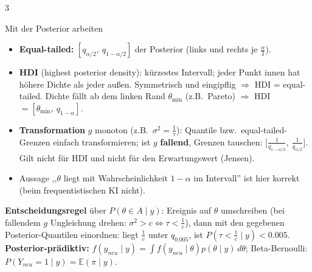 \documentclass[8pt,a4paper,landscape]{extarticle}
\newcommand{\E}{\mathbb{E}}
\newcommand{\ra}{$\Rightarrow$}
\begin{document}
\begin{multicols*}{3}
\begin{wissen}{Mit der Posterior arbeiten}
\begin{itemize}
\item \textbf{Equal-tailed:} $[q_{\alpha/2},\ q_{1-\alpha/2}]$ der Posterior (links und rechts je $\frac\alpha2$).
\item \textbf{HDI} (highest posterior density): kürzestes Intervall; jeder Punkt innen hat höhere Dichte als jeder außen. Symmetrisch und eingipflig \ra{} HDI = equal-tailed. Dichte fällt ab dem linken Rand $\theta_{\min}$ (z.B.\ Pareto) \ra{} HDI $=[\theta_{\min},\ q_{1-\alpha}]$.
\item \textbf{Transformation} $g$ monoton (z.B.\ $\sigma^2=\frac1\tau$): Quantile bzw.\ equal-tailed-Grenzen einfach transformieren; ist $g$ \textbf{fallend}, Grenzen tauschen: $\big[\frac{1}{q_{1-\alpha/2}},\ \frac{1}{q_{\alpha/2}}\big]$. Gilt nicht für HDI und nicht für den Erwartungswert (Jensen).
\item Aussage ,,$\theta$ liegt mit Wahrscheinlichkeit $1-\alpha$ im Intervall'' ist hier korrekt (beim frequentistischen KI nicht).
\end{itemize}
\textbf{Entscheidungsregel} über $P(\theta\in A\mid y)$: Ereignis auf $\theta$ umschreiben (bei fallendem $g$ Ungleichung drehen: $\sigma^2>c\Leftrightarrow\tau<\frac1c$), dann mit den gegebenen Posterior-Quantilen einordnen: liegt $\frac1c$ unter $q_{0.005}$, ist $P(\tau<\frac1c\mid y)<0.005$.
\textbf{Posterior-prädiktiv:} $f(y_{neu}\mid y)=\int f(y_{neu}\mid\theta)p(\theta\mid y)\,d\theta$; Beta-Bernoulli: $P(Y_{neu}=1\mid y)=\E(\pi\mid y)$.
\end{wissen}


\end{multicols*}
\end{document}
